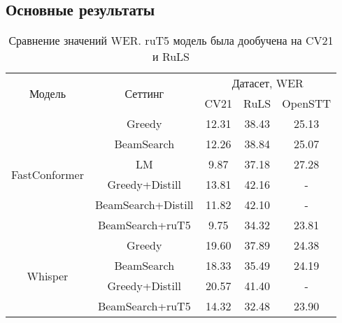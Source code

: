 \subsection{Основные результаты}
\begin{table}[]
\centering
\caption{Сравнение значений WER. ruT5 модель была дообучена на CV21 и RuLS}
\begin{tabular}{|c|c|ccc|}
\hline
\multirow{2}{*}{Модель}        & \multirow{2}{*}{Сеттинг}             & \multicolumn{3}{c|}{Датасет, WER}                                    \\ \cline{3-5} 
                               &                                      & \multicolumn{1}{c|}{CV21}  & \multicolumn{1}{c|}{RuLS}     & OpenSTT \\ \hline
\multirow{6}{*}{FastConformer} & Greedy                               & \multicolumn{1}{c|}{12.31} & \multicolumn{1}{c|}{38.43}    & 25.13   \\ \cline{2-5} 
                               & BeamSearch                           & \multicolumn{1}{c|}{12.26} & \multicolumn{1}{c|}{38.84}    & 25.07   \\ \cline{2-5} 
                               & LM                                   & \multicolumn{1}{c|}{9.87}  & \multicolumn{1}{c|}{37.18}    & 27.28   \\ \cline{2-5} 
                               & Greedy+Distill                       & \multicolumn{1}{c|}{13.81} & \multicolumn{1}{c|}{42.16}    & -       \\ \cline{2-5} 
                               & BeamSearch+Distill                   & \multicolumn{1}{c|}{11.82} & \multicolumn{1}{c|}{42.10}    & -       \\ \cline{2-5} 
                               & BeamSearch+ruT5                      & \multicolumn{1}{c|}{9.75}  & \multicolumn{1}{c|}{34.32}    & 23.81   \\ \hline
\multirow{4}{*}{Whisper}       & Greedy                               & \multicolumn{1}{c|}{19.60} & \multicolumn{1}{c|}{37.89}    & 24.38   \\ \cline{2-5} 
                               & BeamSearch                           & \multicolumn{1}{c|}{18.33} & \multicolumn{1}{c|}{35.49}    & 24.19   \\ \cline{2-5} 
                               & Greedy+Distill                       & \multicolumn{1}{c|}{20.57} & \multicolumn{1}{c|}{41.40}    & -       \\ \cline{2-5} 
                               & BeamSearch+ruT5                      & \multicolumn{1}{c|}{14.32} & \multicolumn{1}{c|}{32.48}    & 23.90   \\ \hline
\end{tabular}
\label{tab:res_full}
\end{table}

